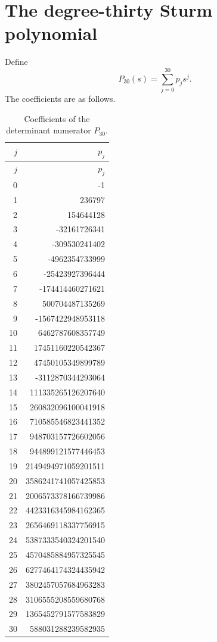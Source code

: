 \documentclass[11pt,oneside]{article}
\theoremstyle{definition}
\theoremstyle{remark}
\begin{document}
\section{The degree-thirty Sturm polynomial}\label{app:P30}
Define
\[
P_{30}(s)=\sum_{j=0}^{30}p_js^j.
\]
The coefficients are as follows.
\begin{longtable}{r@{\hspace{2em}}r}
\caption{Coefficients of the determinant numerator \(P_{30}\).}\label{tab:P30coeffs}\\
\toprule
\(j\)&\(p_j\)\\
\midrule
\endfirsthead
\toprule
\(j\)&\(p_j\)\\
\midrule
\endhead
0 & -1 \\
1 & 236797 \\
2 & 154644128 \\
3 & -32161726341 \\
4 & -309530241402 \\
5 & -4962354733999 \\
6 & -25423927396444 \\
7 & -174414460271621 \\
8 & 500704487135269 \\
9 & -1567422948953118 \\
10 & 6462787608357749 \\
11 & 17451160220542367 \\
12 & 47450105349899789 \\
13 & -3112870344293064 \\
14 & 111335265126207640 \\
15 & 260832096100041918 \\
16 & 710585546823441352 \\
17 & 948703157726602056 \\
18 & 944899121577446453 \\
19 & 2149494971059201511 \\
20 & 3586241741057425853 \\
21 & 2006573378166739986 \\
22 & 4423316345984162365 \\
23 & 2656469118337756915 \\
24 & 5387333540324201540 \\
25 & 4570485884957325545 \\
26 & 6277464174324435942 \\
27 & 3802457057684963283 \\
28 & 3106555208559680768 \\
29 & 1365452791577583829 \\
30 & 588031288239582935 \\
\bottomrule
\end{longtable}
\end{document}
